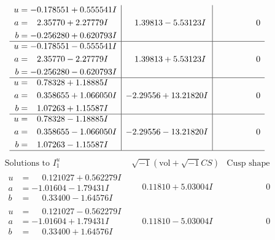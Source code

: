 \documentclass[1p]{elsarticle_modified}
\theoremstyle{definition}
\newcommand{\I}{\sqrt{-1}}
\begin{document}
$$\begin{array}{c|c|c}
\begin{aligned}
u &= -0.178551 + 0.555541 I \\
a &= \phantom{-}2.35770 + 2.27779 I \\
b &= -0.256280 + 0.620793 I\end{aligned}
 & \phantom{-}1.39813 - 5.53123 I & \phantom{-0.000000 } 0 \\ \hline\begin{aligned}
u &= -0.178551 - 0.555541 I \\
a &= \phantom{-}2.35770 - 2.27779 I \\
b &= -0.256280 - 0.620793 I\end{aligned}
 & \phantom{-}1.39813 + 5.53123 I & \phantom{-0.000000 } 0 \\ \hline\begin{aligned}
u &= \phantom{-}0.78328 + 1.18885 I \\
a &= \phantom{-}0.358655 + 1.066050 I \\
b &= \phantom{-}1.07263 + 1.15587 I\end{aligned}
 & -2.29556 + 13.21820 I & \phantom{-0.000000 } 0 \\ \hline\begin{aligned}
u &= \phantom{-}0.78328 - 1.18885 I \\
a &= \phantom{-}0.358655 - 1.066050 I \\
b &= \phantom{-}1.07263 - 1.15587 I\end{aligned}
 & -2.29556 - 13.21820 I & \phantom{-0.000000 } 0\\
 \hline 
 \end{array}$$\newpage$$\begin{array}{c|c|c}  
\text{Solutions to }I^u_{1}& \I (\text{vol} + \sqrt{-1}CS) & \text{Cusp shape}\\
 \hline 
\begin{aligned}
u &= \phantom{-}0.121027 + 0.562279 I \\
a &= -1.01604 - 1.79431 I \\
b &= \phantom{-}0.33400 - 1.64576 I\end{aligned}
 & \phantom{-}0.11810 + 5.03004 I & \phantom{-0.000000 } 0 \\ \hline\begin{aligned}
u &= \phantom{-}0.121027 - 0.562279 I \\
a &= -1.01604 + 1.79431 I \\
b &= \phantom{-}0.33400 + 1.64576 I\end{aligned}
 & \phantom{-}0.11810 - 5.03004 I & \phantom{-0.000000 } 0 \\ \hline\begin{aligned}

\end{aligned}
\end{array}$$
\end{document}
